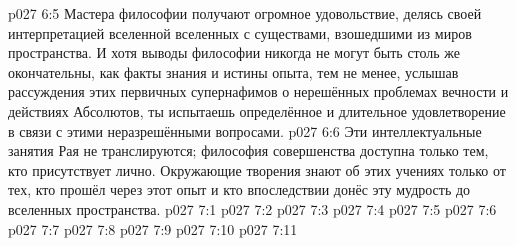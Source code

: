 \vs p027 6:5 Мастера философии получают огромное удовольствие, делясь своей интерпретацией вселенной вселенных с существами, взошедшими из миров пространства. И хотя выводы философии никогда не могут быть столь же окончательны, как факты знания и истины опыта, тем не менее, услышав рассуждения этих первичных супернафимов о нерешённых проблемах вечности и действиях Абсолютов, ты испытаешь определённое и длительное удовлетворение в связи с этими неразрешёнными вопросами.
\vs p027 6:6 Эти интеллектуальные занятия Рая не транслируются; философия совершенства доступна только тем, кто присутствует лично. Окружающие творения знают об этих учениях только от тех, кто прошёл через этот опыт и кто впоследствии донёс эту мудрость до вселенных пространства.
\vs p027 7:1 
\vs p027 7:2 \pc 
\vs p027 7:3 
\vs p027 7:4 \pc 
\vs p027 7:5 
\vs p027 7:6 
\vs p027 7:7 
\vs p027 7:8 \pc 
\vs p027 7:9 \pc 
\vs p027 7:10 
\vsetoff
\vs p027 7:11 
\quizlink
